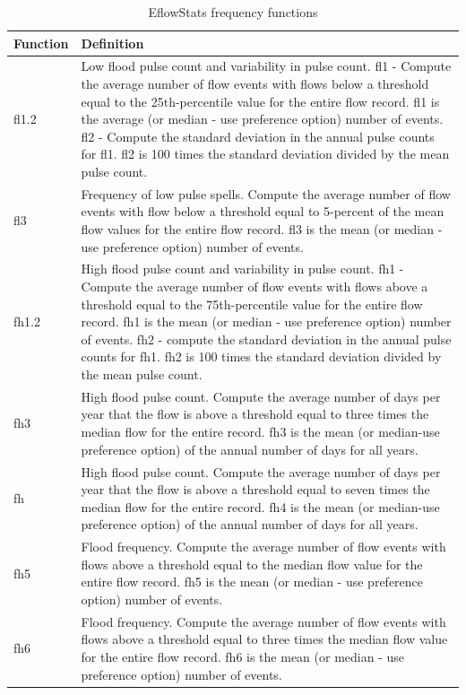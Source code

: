 \documentclass[a4paper,11pt]{article}\usepackage[]{graphicx}\usepackage[]{color}
\begin{document}
\begin{table}[ht]
  \centering
  \begin{threeparttable}[b]
  \caption{EflowStats frequency functions}
  \label{tab:freqStats}
\begin{tabularx}{\textwidth}{|l|X|}
  \hline
\textbf{Function} & \textbf{Definition} \\ 
  \hline
  fl1.2 & Low flood pulse count and variability in pulse count. fl1 - Compute the average number of flow events with flows below a threshold equal to the 25th-percentile value for the entire flow record. fl1 is the average (or median - use preference option) number of events. fl2 - Compute the standard deviation in the annual pulse counts for fl1. fl2 is 100 times the standard deviation divided by the mean pulse count. \\
  fl3 & Frequency of low pulse spells. Compute the average number of flow events with flow below a threshold equal to 5-percent of the mean flow values for the entire flow record. fl3 is the mean (or median - use preference option) number of events. \\
  fh1.2 & High flood pulse count and variability in pulse count. fh1 - Compute the average number of flow events with flows above a threshold equal to the 75th-percentile value for the entire flow record. fh1 is the mean (or median - use preference option) number of events. fh2 - compute the standard deviation in the annual pulse counts for fh1. fh2 is 100 times the standard deviation divided by the mean pulse count. \\
  fh3 & High flood pulse count. Compute the average number of days per year that the flow is above a threshold equal to three times the median flow for the entire record. fh3 is the mean (or median-use preference option) of the annual number of days for all years. \\
  fh & High flood pulse count. Compute the average number of days per year that the flow is above a threshold equal to seven times the median flow for the entire record. fh4 is the mean (or median-use preference option) of the annual number of days for all years. \\
  fh5 & Flood frequency. Compute the average number of flow events with flows above a threshold equal to the median flow value for the entire flow record. fh5 is the mean (or median - use preference option) number of events. \\
  fh6 & Flood frequency. Compute the average number of flow events with flows above a threshold equal to three times the median flow value for the entire flow record. fh6 is the mean (or median - use preference option) number of events. \\

\end{tabularx}
\end{threeparttable}
\end{table}
\end{document}

